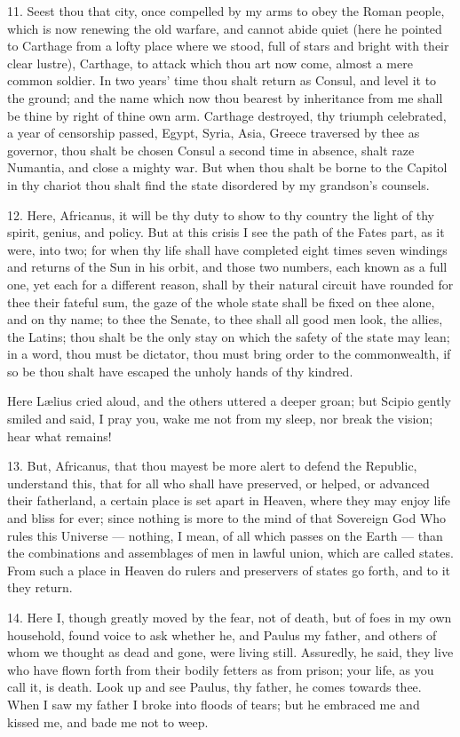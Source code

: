 \documentclass[a4paper, 11pt, oneside, polutonikogreek, english]{article}
\begin{document}
11. Seest thou that city, once compelled by my arms to obey the Roman people, which is now renewing the old warfare, and cannot abide quiet (here he pointed to Carthage from a lofty place where we stood, full of stars and bright with their clear lustre), Carthage, to attack which thou art now come, almost a mere common soldier. In two years' time thou shalt return as Consul, and level it to the ground; and the name which now thou bearest by inheritance from me shall be thine by right of thine own arm. Carthage destroyed, thy triumph celebrated, a year of censorship passed, Egypt, Syria, Asia, Greece traversed by thee as governor, thou shalt be chosen Consul a second time in absence, shalt raze Numantia, and close a mighty war. But when thou shalt be borne to the Capitol in thy chariot thou shalt find the state disordered by my grandson's counsels.

12. Here, Africanus, it will be thy duty to show to thy country the light of thy spirit, genius, and policy. But at this crisis I see the path of the Fates part, as it were, into two; for when thy life shall have completed eight times seven windings and returns of the Sun in his orbit, and those two numbers, each known as a full one, yet each for a different reason, shall by their natural circuit have rounded for thee their fateful sum, the gaze of the whole state shall be fixed on thee alone, and on thy name; to thee the Senate, to thee shall all good men look, the allies, the Latins; thou shalt be the only stay on which the safety of the state may lean; in a word, thou must be dictator, thou must bring order to the commonwealth, if so be thou shalt have escaped the unholy hands of thy kindred.

Here Lælius cried aloud, and the others uttered a deeper groan; but Scipio gently smiled and said, I pray you, wake me not from my sleep, nor break the vision; hear what remains!

13. But, Africanus, that thou mayest be more alert to defend the Republic, understand this, that for all who shall have preserved, or helped, or advanced their fatherland, a certain place is set apart in Heaven, where they may enjoy life and bliss for ever; since nothing is more to the mind of that Sovereign God Who rules this Universe --- nothing, I mean, of all which passes on the Earth --- than the combinations and assemblages of men in lawful union, which are called states. From such a place in Heaven do rulers and preservers of states go forth, and to it they return.

14. Here I, though greatly moved by the fear, not of death, but of foes in my own household, found voice to ask whether he, and Paulus my father, and others of whom we thought as dead and gone, were living still. Assuredly, he said, they live who have flown forth from their bodily fetters as from prison; your life, as you call it, is death. Look up and see Paulus, thy father, he comes towards thee. When I saw my father I broke into floods of tears; but he embraced me and kissed me, and bade me not to weep.
\end{document}
